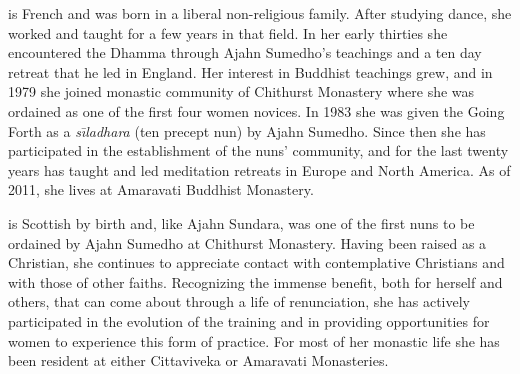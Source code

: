 
\newcommand{\bioname}[1]{{\chaptitlefont\color{chapter}\normalsize\MakeUppercase{\soChapter{#1}}}\hspace*{.3em}}

\noindent\bioname{Ajahn Sundara} is French and was born in a liberal non-religious family. After studying dance, she worked and taught for a few years in that field. In her early thirties she encountered the Dhamma through Ajahn Sumedho's teachings and a ten day retreat that he led in England. Her interest in Buddhist teachings grew, and in 1979 she joined monastic community of Chithurst Monastery where she was ordained as one of the first four women novices. In 1983 she was given the Going Forth as a \textit{s\={\i}ladhara} (ten precept nun) by Ajahn Sumedho. Since then she has participated in the establishment of the nuns' community, and for the last twenty years has taught and led meditation retreats in Europe and North America. As of 2011, she lives at Amaravati Buddhist Monastery.

\vspace*{2\baselineskip}

\noindent\bioname{Ajahn Candasiri} is Scottish by birth and, like Ajahn Sundara, was one of the first nuns to be ordained by Ajahn Sumedho at Chithurst Monastery. Having been raised as a Christian, she continues to appreciate contact with contemplative Christians and with those of other faiths. Recognizing the immense benefit, both for herself and others, that can come about through a life of renunciation, she has actively participated in the evolution of the training and in providing opportunities for women to experience this form of practice. For most of her monastic life she has been resident at either Cittaviveka or Amaravati Monasteries.

